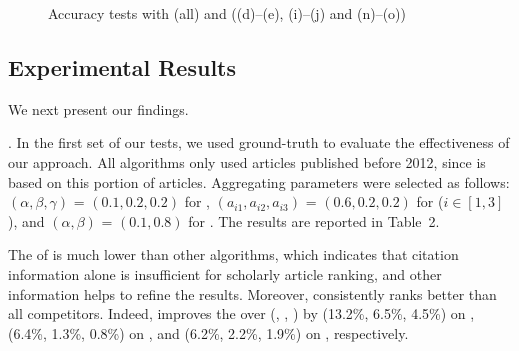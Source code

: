 \begin{figure}[tb!]
\begin{center}
\end{center}
\vspace{-4.5ex}
\caption{\small Accuracy tests with \fcita (all) and \recom ((d)--(e), (i)--(j) and (n)--(o))}
\label{fig-pairacc}
\vspace{-3ex}
\end{figure}



\subsection{Experimental Results}
\label{subsec-expres}

We next present our findings.

.
In the first set of our tests, we used ground-truth \recom to evaluate the effectiveness of our approach.
All algorithms only used articles published before 2012, since \recom is based on this portion of articles.
Aggregating parameters were selected as follows: $(\alpha,\beta,\gamma)$ = $(0.1, 0.2, 0.2)$ for \futurerank, $(a_{i1},a_{i2},a_{i3})$ = $(0.6, 0.2, 0.2)$ for \hhgrank ($i\in[1,3]$), and $(\alpha,\beta)$ = $(0.1, 0.8)$ for \ensemblerank.
The results are reported in Table~2.

The \PairAcc of \pagerank is much lower than other algorithms, which indicates that citation information alone is insufficient for scholarly article ranking, and other information helps to refine the results. Moreover, \ensemblerank consistently ranks better than all competitors. Indeed, \ensemblerank improves the \PairAcc over (\pagerank, \futurerank, \hhgrank) by (13.2\%, 6.5\%, 4.5\%) on \aan, (6.4\%, 1.3\%, 0.8\%) on \aminer, and (6.2\%, 2.2\%, 1.9\%) on \magdata, respectively.

